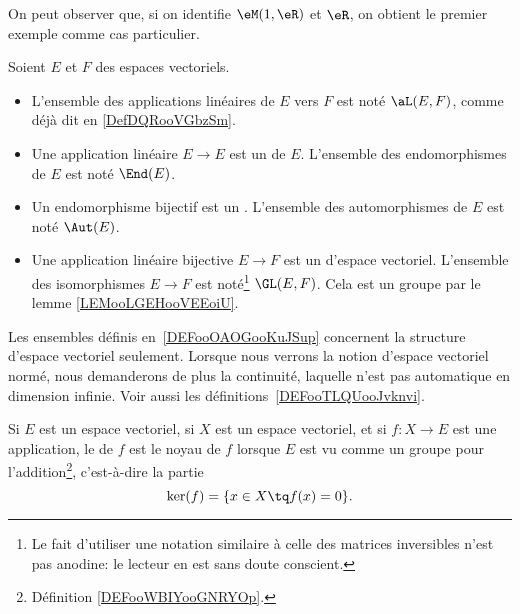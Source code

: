 On peut observer que, si on identifie $\eM(1, \eR)$ et $\eR$, on obtient le premier exemple comme cas particulier.

\begin{definition}      \label{DEFooOAOGooKuJSup}
    Soient \( E\) et \( F\) des espaces vectoriels.
    \begin{itemize}
        \item
            L'ensemble des applications linéaires de \( E\) vers \( F\) est noté $\aL(E,F)$, comme déjà dit en \ref{DefDQRooVGbzSm}.
        \item Une application linéaire \( E\to E\) est un  de \( E\). L'ensemble des endomorphismes de \( E\) est noté \( \End(E)\).
        \item Un endomorphisme bijectif est un . L'ensemble des automorphismes de \( E\) est noté \( \Aut(E)\).
        \item
            Une application linéaire bijective \( E\to F\) est un  d'espace vectoriel. L'ensemble des isomorphismes \( E\to F\) est noté\footnote{Le fait d'utiliser une notation similaire à celle des matrices inversibles n'est pas anodine: le lecteur en est sans doute conscient.} \( \GL(E,F)\). Cela est un groupe par le lemme \ref{LEMooLGEHooVEEoiU}.
    \end{itemize}
\end{definition}

\begin{remark}
    Les ensembles définis en~\ref{DEFooOAOGooKuJSup} concernent la structure d'espace vectoriel seulement. Lorsque nous verrons la notion d'espace vectoriel normé, nous demanderons de plus la continuité, laquelle n'est pas automatique en dimension infinie. Voir aussi les définitions~\ref{DEFooTLQUooJvknvi}.
\end{remark}

\begin{definition}
    Si \( E\) est un espace vectoriel, si \( X\) est un espace vectoriel, et si \( f\colon X\to E\) est une application, le  de \( f\) est le noyau de \( f\) lorsque \( E\) est vu comme un groupe pour l'addition\footnote{Définition \ref{DEFooWBIYooGNRYOp}.}, c'est-à-dire la partie
    \begin{equation}
        \ker(f)=\{ x\in X\tq f(x)=0 \}.
    \end{equation}
\end{definition}

